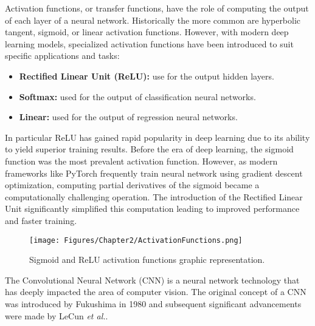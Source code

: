 Activation functions, or transfer functions, have the role of computing the output of each layer of a neural network. Historically the more common are hyperbolic tangent, sigmoid, or linear activation functions. However, with modern deep learning models, specialized activation functions have been introduced to suit specific applications and tasks:
\begin{itemize}
    \item\textbf{Rectified Linear Unit (ReLU):} use for the output hidden layers.
    \item\textbf{Softmax:} used for the output of classification neural networks.
    \item\textbf{Linear:} used for the output of regression neural networks.
\end{itemize}
In particular ReLU has gained rapid popularity in deep learning due to its ability to yield superior training results. Before the era of deep learning, the sigmoid function was the most prevalent activation function. However, as modern frameworks like PyTorch frequently train neural network using gradient descent optimization, computing partial derivatives of the sigmoid became a computationally challenging operation. The introduction of the Rectified Linear Unit significantly simplified this computation leading to improved performance and faster training.

\begin{figure}[th]
    \centering
    \texttt{[image: Figures/Chapter2/ActivationFunctions.png]}
    \caption[Sigmoid vs. ReLU]{Sigmoid and ReLU activation functions graphic representation.}
    \label{fig:ActivationFunctions}
\end{figure}


The Convolutional Neural Network (CNN) is a neural network technology that has deeply impacted the area of computer vision. The original concept of a CNN was introduced by Fukushima in 1980\parencite{fukushima} and subsequent significant advancements were made by LeCun \emph{et al.}\parencite{Lecun}.

